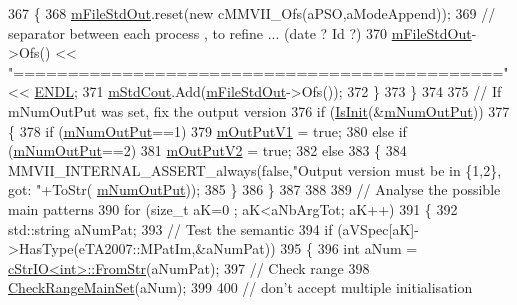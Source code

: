 \begin{DoxyCode}
367      \{
368          \hyperlink{classMMVII_1_1cMMVII__Appli_a1451d999479ebc46ee77273b753d7803}{mFileStdOut}.reset(\textcolor{keyword}{new} cMMVII\_Ofs(aPSO,aModeAppend));
369          \textcolor{comment}{// separator between each process , to refine ... (date ? Id ?)}
370          \hyperlink{classMMVII_1_1cMMVII__Appli_a1451d999479ebc46ee77273b753d7803}{mFileStdOut}->Ofs() << \textcolor{stringliteral}{"============================================="} << 
      \hyperlink{MMVII__util_8h_a90dc3f3ee970394e0080300526390a84}{ENDL};
371          \hyperlink{classMMVII_1_1cMMVII__Appli_ab9332c2d0457538973077e9e2dca3609}{mStdCout}.Add(\hyperlink{classMMVII_1_1cMMVII__Appli_a1451d999479ebc46ee77273b753d7803}{mFileStdOut}->Ofs());
372      \}
373   \}
374 
375   \textcolor{comment}{// If mNumOutPut was set, fix the output version}
376   \textcolor{keywordflow}{if} (\hyperlink{classMMVII_1_1cMMVII__Appli_a3363a4afe1f4f43e28df0799ab31149a}{IsInit}(&\hyperlink{classMMVII_1_1cMMVII__Appli_a55fc539a1cf1434f2ee551143fe55c86}{mNumOutPut}))
377   \{
378      \textcolor{keywordflow}{if} (\hyperlink{classMMVII_1_1cMMVII__Appli_a55fc539a1cf1434f2ee551143fe55c86}{mNumOutPut}==1)
379         \hyperlink{classMMVII_1_1cMMVII__Appli_aab0afe4402fb58c398d89b89b09e654e}{mOutPutV1} = \textcolor{keyword}{true};
380      \textcolor{keywordflow}{else} \textcolor{keywordflow}{if} (\hyperlink{classMMVII_1_1cMMVII__Appli_a55fc539a1cf1434f2ee551143fe55c86}{mNumOutPut}==2)
381         \hyperlink{classMMVII_1_1cMMVII__Appli_a9ec8d0edd89cc621fc3264b4d6136ad0}{mOutPutV2} = \textcolor{keyword}{true};
382      \textcolor{keywordflow}{else}
383      \{
384          MMVII\_INTERNAL\_ASSERT\_always(\textcolor{keyword}{false},\textcolor{stringliteral}{"Output version must be in \{1,2\}, got: "}+ToStr(
      \hyperlink{classMMVII_1_1cMMVII__Appli_a55fc539a1cf1434f2ee551143fe55c86}{mNumOutPut}));
385      \}
386   \}
387 
388 
389   \textcolor{comment}{// Analyse the possible main patterns}
390   \textcolor{keywordflow}{for} (\textcolor{keywordtype}{size\_t} aK=0 ; aK<aNbArgTot; aK++)
391   \{
392       std::string aNumPat;
393       \textcolor{comment}{// Test the semantic}
394       \textcolor{keywordflow}{if} (aVSpec[aK]->HasType(eTA2007::MPatIm,&aNumPat))
395       \{
396          \textcolor{keywordtype}{int} aNum =   \hyperlink{classMMVII_1_1cStrIO_a72abe4284fce635f36559f6ffd8afc2a}{cStrIO<int>::FromStr}(aNumPat);
397          \textcolor{comment}{// Check range}
398          \hyperlink{classMMVII_1_1cMMVII__Appli_a0ab3f7ea6bb7775be1ec7e244e5ea6a3}{CheckRangeMainSet}(aNum);
399 
400          \textcolor{comment}{// don't accept multiple initialisation}

\end{DoxyCode}
